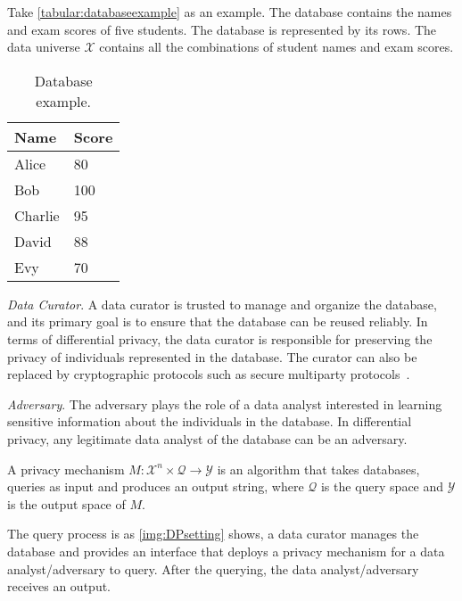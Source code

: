 Take \autoref{tabular:databaseexample} as an example. The database contains the names and exam scores of five students. The database is represented by its rows. The data universe $\mathcal{X}$ contains all the combinations of student names and exam scores.

\begin{table}[tbh!]
    \centering
    \begin{tabular}{|l|l|}
        \hline
        Name    & Score \\
        \hline
        Alice   & 80    \\
        \hline
        Bob     & 100   \\
        \hline
        Charlie & 95    \\
        \hline
        David   & 88    \\
        \hline
        Evy     & 70    \\
        \hline
    \end{tabular}
    \caption{Database example.}
    \label{tabular:databaseexample}
\end{table}
\FloatBarrier


\emph{Data Curator}. A data curator is trusted to manage and organize the database, and its primary goal is to ensure that the database can be reused reliably. In terms of differential privacy, the data curator is responsible for preserving the privacy of individuals represented in the database. The curator can also be replaced by cryptographic protocols such as secure multiparty protocols~\cite{goldreich2019play}.

\emph{Adversary}. The adversary plays the role of a data analyst interested in learning sensitive information about the individuals in the database. In differential privacy, any legitimate data analyst of the database can be an adversary.

\begin{definition}
    A privacy mechanism $M:\mathcal{X}^{n}\times \mathcal{Q}\rightarrow \mathcal{Y}$ is an algorithm that takes databases, queries as input and produces an output string,
    where $\mathcal{Q}$ is the query space and $\mathcal{Y}$ is the output space of $M$.
\end{definition}

The query process is as \autoref{img:DPsetting} shows, a data curator manages the database and provides an interface that deploys a privacy mechanism for a data analyst/adversary to query. After the querying, the data analyst/adversary receives an output.

